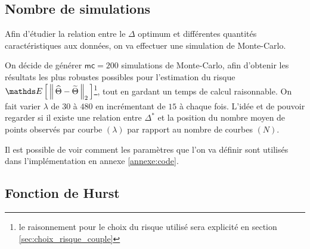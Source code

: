 
\subsection{Nombre de simulations}

Afin d'étudier la relation entre le $\Delta$ optimum et différentes quantités caractéristiques aux données, on va effectuer une simulation de Monte-Carlo.

On décide de générer $\mathsf{mc} = 200$ simulations de Monte-Carlo, afin d'obtenir les résultats les plus robustes possibles pour l'estimation du risque $\esperance{\distnorme 2 {\widehat \Theta} {\widetilde \Theta}}$\footnote{le raisonnement pour le choix du risque utilisé sera explicité en section \ref{sec:choix_risque_couple}}, tout en gardant un temps de calcul raisonnable. On fait varier $\lambda$ de $30$ à $480$ en incrémentant de $15$ à chaque fois. L'idée et de pouvoir regarder si il existe une relation entre $\Delta^*$ et la position du nombre moyen de points observés par courbe $(\lambda)$ par rapport au nombre de courbes $(N)$.

\smallskip

Il est possible de voir comment les paramètres que l'on va définir sont utilisés dans l'implémentation en annexe \ref{annexe:code}.


\newcommand{\tlnm}{T^{[\lambda]}_{n}[m]}
\newcommand{\mset}{\llbracket 1, M_n \rrbracket}
\newcommand{\nset}{\llbracket 1, N \rrbracket}
\newcommand{\lbdset}{\llbracket 30, 45, \dots , 480 \rrbracket}
\newcommand{\genxset}{\bigl(\tlnm, X_n(\tlnm)\bigr)_{m \in \mset}}
\newcommand{\simset}{\left\{ \genxset \, : \, n \in \nset, \, \lambda \& N \textsf{ fixés } \right\}}
\newcommand{\simsetall}{\left\{ \genxset \, : \, N \in \overrightarrow N, \, \lambda \in \lbdset, \, n \in \nset \right\}}

\subsection{Fonction de Hurst}
\label{sec:sim_fcn_hurst}


